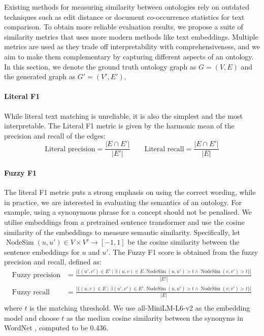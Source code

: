 \documentclass{article}
\DeclareMathOperator{\nodesim}{NodeSim}
\begin{document}
Existing methods for measuring similarity between ontologies rely on outdated techniques such as edit distance or document co-occurrence statistics for text comparison. To obtain more reliable evaluation results, we propose a suite of similarity metrics that uses more modern methods like text embeddings. Multiple metrics are used as they trade off interpretability with comprehensiveness, and we aim to make them complementary by capturing different aspects of an ontology. In this section, we denote the ground truth ontology graph as $G = (V, E)$ and the generated graph as $G' = (V', E')$.

\paragraph{Literal F1 \cite{Kashyap2005TaxaMinerAE}}
While literal text matching is unreliable, it is also the simplest and the most interpretable. The Literal F1 metric is given by the harmonic mean of the precision and recall of the edges:
\[
    \text{Literal precision} = \frac{|E \cap E'|}{|E'|} \qquad
    \text{Literal recall} = \frac{|E \cap E'|}{|E|}
\]

\paragraph{Fuzzy F1}
The literal F1 metric puts a strong emphasis on using the correct wording, while in practice, we are interested in evaluating the semantics of an ontology. For example, using a synonymous phrase for a concept should not be penalised. We utilise embeddings from a pretrained sentence transformer and use the cosine similarity of the embeddings to measure semantic similarity. Specifically, let $\nodesim(u, u') \in V \times V' \to [-1, 1]$ be the cosine similarity between the sentence embeddings for $u$ and $u'$. The Fuzzy F1 score is obtained from the fuzzy precision and recall, defined as:
\begin{equation*}
    \begin{aligned}
        \text{Fuzzy precision} & = \frac{|
            \{(u', v') \in E' \mid \exists (u, v) \in E.
            \nodesim(u, u') > t \land \nodesim(v, v') > t
            \}
        |}{|E'|}                           \\
        \text{Fuzzy recall}    & = \frac{|
            \{(u, v) \in E \mid \exists (u', v') \in E'.
            \nodesim(u, u') > t \land \nodesim(v, v') > t
            \}
        |}{|E|}                            \\
    \end{aligned}
\end{equation*}
where $t$ is the matching threshold. We use all-MiniLM-L6-v2 \cite{wang2020minilm,reimers-2019-sentence-bert} as the embedding model and choose $t$ as the median cosine similarity between the synonyms in WordNet \cite{miller1995wordnet}, computed to be 0.436.
\end{document}
